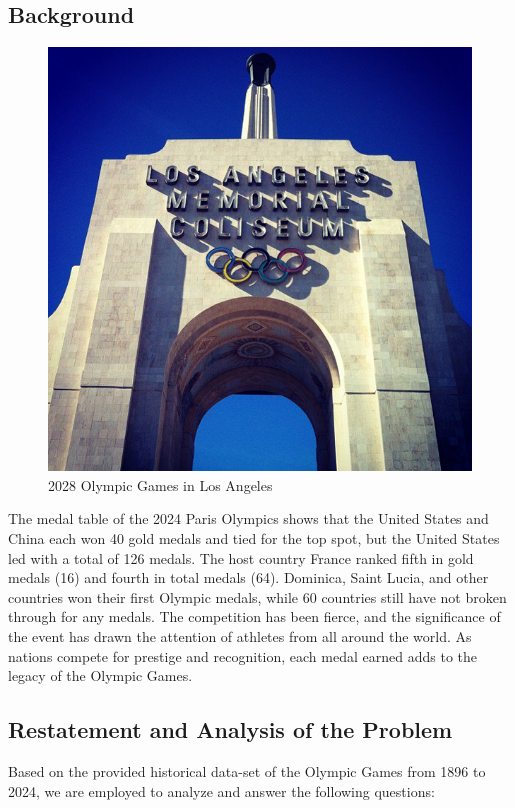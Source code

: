 \documentclass{mcmthesis}
\begin{document}
\subsection{Background}
\begin{figure}  %
	\centering
	\includegraphics[width=0.76\linewidth]{fig/backgroud3.png}
	\caption{2028 Olympic Games in Los Angeles}
\end{figure}
The medal table of the 2024 Paris Olympics shows that the United States and China each won 40 gold medals and tied for the top spot, but the United States led with a total of 126 medals. The host country France ranked fifth in gold medals (16) and fourth in total medals (64). Dominica, Saint Lucia, and other countries won their first Olympic medals, while 60 countries still have not broken through for any medals. The competition has been fierce, and the significance of the event has drawn the attention of athletes from all around the world. As nations compete for prestige and recognition, each medal earned adds to the legacy of the Olympic Games.


\vspace{1.5\baselineskip}
	\subsection{Restatement and Analysis of the Problem}
	Based on the provided historical data-set of the Olympic Games from 1896 to 2024, we are employed to analyze and answer the following questions:
	
\end{document}
